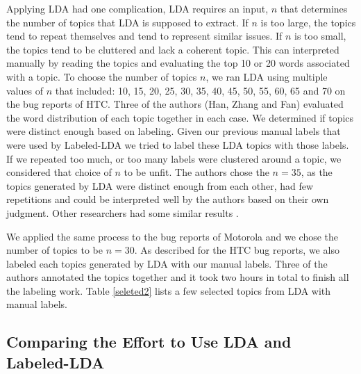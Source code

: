 \documentclass[10pt, conference, compsocconf]{IEEEtran}
\begin{document}
Applying LDA had one complication, LDA requires an input, $n$ that
determines the number of topics that LDA is supposed to extract. If
$n$ is too large, the topics tend to repeat themselves and tend to
represent similar issues. If $n$ is too small, the topics tend to
be cluttered and lack a coherent topic. This can interpreted manually
by reading the topics and evaluating the top 10 or 20 words associated
with a topic.
To choose the number of topics $n$, we ran LDA using multiple values
of $n$ that included: 10, 15, 20, 25, 30, 35, 40, 45, 50, 55, 60, 65
and 70 on the bug reports of HTC. 
Three of the authors (Han, Zhang and Fan) evaluated the word distribution of each topic
together in each case. 
We determined if topics were distinct enough based on labeling. Given
our previous manual labels that were used by Labeled-LDA we tried to label these LDA topics
with those labels. If we repeated too much, or too many labels were
clustered around a topic, we considered that choice of $n$ to be unfit.
The authors chose the $n = 35$, as the topics generated by LDA
were distinct enough from each other, had few repetitions and could be
interpreted well by the authors based on their own judgment.
Other researchers had some similar results
\cite{Thomas:2011,Hindle2011,Hindle}. 

We applied the same process to the bug reports of Motorola and we chose
the number of topics to be $n = 30$. 
As described for the HTC bug reports, we also labeled each topics
generated by LDA with our manual labels.
Three of the authors annotated the topics together and it took two
hours in total to finish all the labeling work. 
Table \ref{seleted2} lists a few selected topics from LDA with manual labels.


\subsection{Comparing the Effort to Use LDA and Labeled-LDA}

\end{document}
